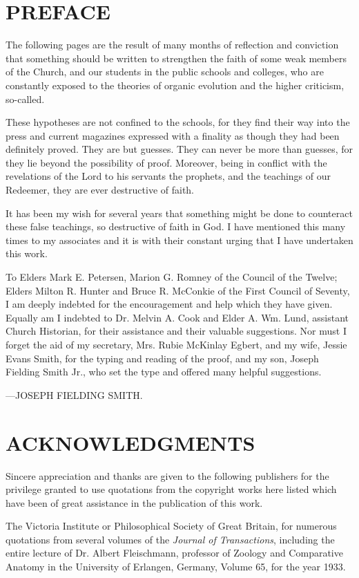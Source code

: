 \newpage
\section{PREFACE}
The following pages are the result of many months of reflection and conviction that
something should be written to strengthen the faith of some weak members of the Church,
and our students in the public schools and colleges, who are constantly exposed to the
theories of organic evolution and the higher criticism, so-called.

These hypotheses are not confined to the schools, for they find their way into the press and
current magazines expressed with a finality as though they had been definitely proved. They
are but guesses. They can never be more than guesses, for they lie beyond the possibility of
proof. Moreover, being in conflict with the revelations of the Lord to his servants the
prophets, and the teachings of our Redeemer, they are ever destructive of faith.

It has been my wish for several years that something might be done to counteract these false
teachings, so destructive of faith in God. I have mentioned this many times to my associates
and it is with their constant urging that I have undertaken this work.

To Elders Mark E. Petersen, Marion G. Romney of the Council of the Twelve; Elders Milton
R. Hunter and Bruce R. McConkie of the First Council of Seventy, I am deeply indebted for
the encouragement and help which they have given. Equally am I indebted to Dr. Melvin A.
Cook and Elder A. Wm. Lund, assistant Church Historian, for their assistance and their
valuable suggestions. Nor must I forget the aid of my secretary, Mrs. Rubie McKinlay
Egbert, and my wife, Jessie Evans Smith, for the typing and reading of the proof, and my
son, Joseph Fielding Smith Jr., who set the type and offered many helpful suggestions.

\vspace{\onelineskip}
—JOSEPH FIELDING SMITH.

\newpage
\section{ACKNOWLEDGMENTS}
Sincere appreciation and thanks are given to the following publishers for the privilege
granted to use quotations from the copyright works here listed which have been of great
assistance in the publication of this work.

The Victoria Institute or Philosophical Society of Great Britain, for numerous quotations
from several volumes of the \textit{Journal of Transactions}, including the entire lecture of Dr.
Albert Fleischmann, professor of Zoology and Comparative Anatomy in the University of
Erlangen, Germany, Volume 65, for the year 1933.


